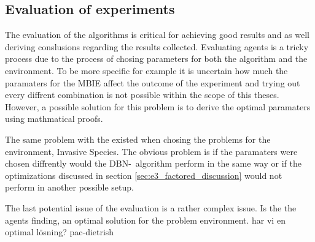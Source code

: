 \subsection{Evaluation of experiments }
The evaluation of the algorithms is critical for achieving good results and as well deriving conslusions regarding the results collected. Evaluating agents is a tricky process due to the process of chosing  parameters for both the algorithm and the environment. To be more specific for example it is uncertain how much the paramaters for the MBIE affect the outcome of the experiment and trying out every diffrent combination is not possible within the scope of this theses. However, a possible solution for this problem is to derive the optimal paramaters using mathmatical proofs.

The same problem with the existed when chosing the problems for the environment, Invasive Species. The obvious problem is if the paramaters were chosen diffrently would the DBN-\etre\ algorithm perform in the same way or if the optimizations discussed in section \ref{sec:e3_factored_discussion} would not perform in another possible setup. 

The last potential issue of the evaluation is a rather complex issue. Is the  the agents finding, an optimal solution for the problem environment. 
har vi en optimal lösning? pac-dietrish